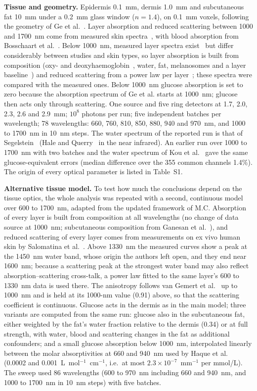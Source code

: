 \documentclass[11pt]{article}
\begin{document}
\textbf{Tissue and geometry.} Epidermis 0.1~mm, dermis 1.0~mm and subcutaneous fat 10~mm under a 0.2~mm glass window ($n=1.4$), on 0.1~mm voxels, following the geometry of Ge et al.~\citep{ge2024}. Layer absorption and reduced scattering between 1000 and 1700~nm come from measured skin spectra~\citep{iino2003}, with blood absorption from Bosschaart et al.~\citep{bosschaart2014}. Below 1000~nm, measured layer spectra exist~\citep{simpson1998,shimojo2020} but differ considerably between studies and skin types, so layer absorption is built from composition (oxy- and deoxyhaemoglobin~\citep{bosschaart2014}, water, fat, melanosomes and a layer baseline~\citep{jacques2013}) and reduced scattering from a power law per layer~\citep{jacques2013}; these spectra were compared with the measured ones. Below 1000~nm glucose absorption is set to zero because the absorption spectrum of Ge et al. starts at 1000~nm; glucose then acts only through scattering. One source and five ring detectors at 1.7, 2.0, 2.3, 2.6 and 2.9~mm; $10^8$ photons per run; five independent batches per wavelength; 78 wavelengths: 660, 760, 810, 850, 880, 940 and 970~nm, and 1000 to 1700~nm in 10~nm steps. The water spectrum of the reported run is that of Segelstein~\citep{segelstein1981} (Hale and Querry~\citep{hale1973} in the near infrared). An earlier run over 1000 to 1700~nm with two batches and the water spectrum of Kou et al.~\citep{kou1993} gave the same glucose-equivalent errors (median difference over the 355 common channels 1.4\%). The origin of every optical parameter is listed in Table~S1.

\textbf{Alternative tissue model.} To test how much the conclusions depend on the tissue optics, the whole analysis was repeated with a second, continuous model over 600 to 1700~nm, adapted from the updated framework of M.C. Absorption of every layer is built from composition at all wavelengths (no change of data source at 1000~nm; subcutaneous composition from Ganesan et al.~\citep{ganesan2016}), and reduced scattering of every layer comes from measurements on ex vivo human skin by Salomatina et al.~\citep{salomatina2006}. Above 1330~nm the measured curves show a peak at the 1450~nm water band, whose origin the authors left open, and they end near 1600~nm; because a scattering peak at the strongest water band may also reflect absorption--scattering cross-talk, a power law fitted to the same layer's 600 to 1330~nm data is used there. The anisotropy follows van Gemert et al.~\citep{vangemert1989} up to 1000~nm and is held at its 1000-nm value (0.91) above, so that the scattering coefficient is continuous. Glucose acts in the dermis as in the main model; three variants are computed from the same run: glucose also in the subcutaneous fat, either weighted by the fat's water fraction relative to the dermis (0.34) or at full strength, with water, blood and scattering changes in the fat as additional confounders; and a small glucose absorption below 1000~nm, interpolated linearly between the molar absorptivities at 660 and 940~nm used by Haque et al.~\citep{haque2021} (0.0002 and 0.001~L~mol$^{-1}$~cm$^{-1}$, i.e.\ at most $2.3\times10^{-7}$~mm$^{-1}$ per mmol/L). The sweep used 86 wavelengths (600 to 970~nm including 660 and 940~nm, and 1000 to 1700~nm in 10~nm steps) with five batches.
\end{document}
